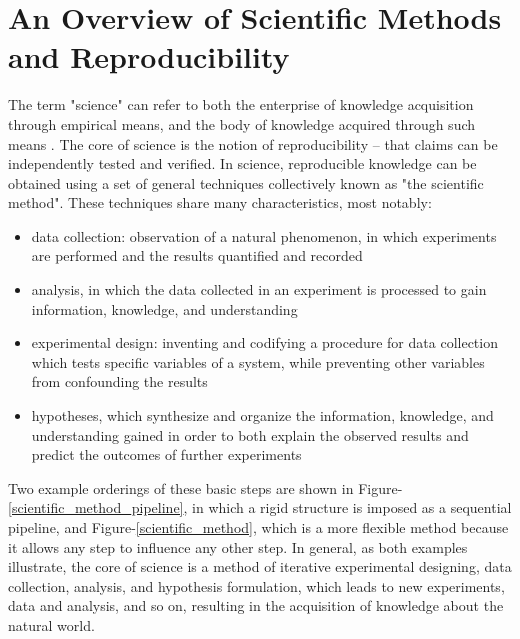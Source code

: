 \section{An Overview of Scientific Methods and Reproducibility}
The term "science" can refer to both the enterprise of knowledge acquisition 
through empirical means, and the body of knowledge acquired through such means 
\cite{drummond2012reproducible}.
The core of science is the notion of reproducibility 
\cite{russell2013reproducibility, nih2014reproducibility} -- that claims can be 
independently tested and verified.  In science, reproducible knowledge can be 
obtained using a set of general techniques collectively known as "the 
scientific method".  These techniques share many characteristics, most notably:
\begin{itemize}
 \item data collection: observation of a natural phenomenon, in which 
 experiments are performed and the results quantified and recorded
 \item analysis, in which the data collected in an experiment is processed to 
 gain information, knowledge, and understanding
 \item experimental design: inventing and codifying a procedure for data 
 collection which tests specific variables of a system, while preventing 
 other variables from confounding the results
 \item hypotheses, which synthesize and organize the information, knowledge, 
 and understanding gained in order to both explain the observed results and 
 predict the outcomes of further experiments
\end{itemize}

Two example orderings of these basic steps are shown in 
Figure-\ref{scientific_method_pipeline}, in which a rigid structure is
imposed as a sequential pipeline, and Figure-\ref{scientific_method}, which 
is a more flexible method because it allows any step to influence any other 
step.  In general, as both examples illustrate, the core of science is a
method of iterative experimental designing, data collection, analysis, and 
hypothesis formulation, which leads to new experiments, data and analysis,  
and so on, resulting in the acquisition of knowledge about the natural world.

